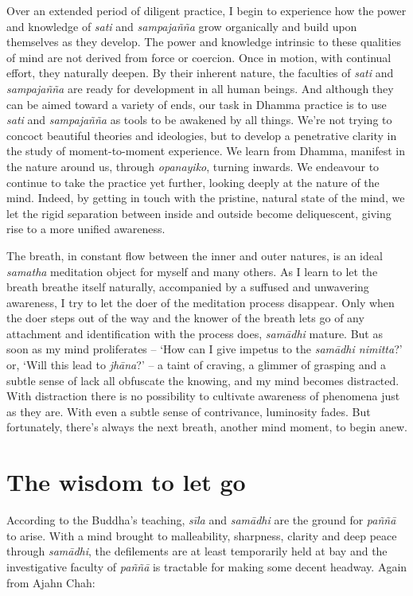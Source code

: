 Over an extended period of diligent practice, I begin to experience how
the power and knowledge of \emph{sati} and \emph{sampajañña} grow
organically and build upon themselves as they develop. The power and
knowledge intrinsic to these qualities of mind are not derived from
force or coercion. Once in motion, with continual effort, they naturally
deepen. By their inherent nature, the faculties of \emph{sati} and
\emph{sampajañña} are ready for development in all human beings. And
although they can be aimed toward a variety of ends, our task in Dhamma
practice is to use \emph{sati} and \emph{sampajañña} as tools to be
awakened by all things. We're not trying to concoct beautiful theories
and ideologies, but to develop a penetrative clarity in the study of
moment-to-moment experience. We learn from Dhamma, manifest in the
nature around us, through \emph{opanayiko}, turning inwards. We
endeavour to continue to take the practice yet further, looking deeply
at the nature of the mind. Indeed, by getting in touch with the
pristine, natural state of the mind, we let the rigid separation between
inside and outside become deliquescent, giving rise to a more unified
awareness. 

The breath, in constant flow between the inner and outer natures, is an
ideal \emph{samatha} meditation object for myself and many others. As I
learn to let the breath breathe itself naturally, accompanied by a
suffused and unwavering awareness, I try to let the doer of the
meditation process disappear. Only when the doer steps out of the way
and the knower of the breath lets go of any attachment and
identification with the process does, \emph{samādhi} mature. But as soon
as my mind proliferates -- `How can I give impetus to the \emph{samādhi
nimitta}?' or, `Will this lead to \emph{jhāna}?' -- a taint of craving, 
a glimmer of grasping and a subtle sense of lack all obfuscate the
knowing, and my mind becomes distracted. With distraction there is no
possibility to cultivate awareness of phenomena just as they are. With
even a subtle sense of contrivance, luminosity fades. But fortunately, 
there's always the next breath, another mind moment, to begin anew. 

\section{The wisdom to let go}

According to the Buddha's teaching, \emph{sīla} and \emph{samādhi} are
the ground for \emph{paññā} to arise. With a mind brought to
malleability, sharpness, clarity and deep peace through \emph{samādhi}, 
the defilements are at least temporarily held at bay and the
investigative faculty of \emph{paññā} is tractable for making some
decent headway. Again from Ajahn Chah: 

